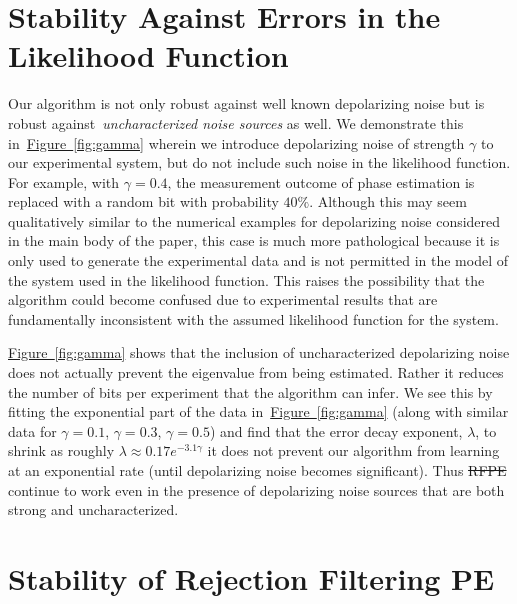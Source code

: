 \documentclass[aps,pra,amsmath,twocolumn,amssymb,superscriptaddress]{revtex4-1}
\newcommand{\fig}[1]{\hyperref[fig:#1]{Figure~\ref*{fig:#1}}}
\providecommand{\DIFaddtex}[1]{{\protect\color{blue}\uwave{#1}}} %
\providecommand{\DIFdeltex}[1]{{\protect\color{red}\sout{#1}}}                      %
\providecommand{\DIFaddbegin}{} %
\providecommand{\DIFaddend}{} %
\providecommand{\DIFdelbegin}{} %
\providecommand{\DIFdelend}{} %
\providecommand{\DIFadd}[1]{\texorpdfstring{\DIFaddtex{#1}}{#1}} %
\providecommand{\DIFdel}[1]{\texorpdfstring{\DIFdeltex{#1}}{}} %
\begin{document}
\section{Stability Against Errors in the Likelihood Function}


Our algorithm is not only robust against well known depolarizing noise but is robust against~\emph{uncharacterized noise sources} as well.  We demonstrate this in~\fig{gamma} wherein we introduce depolarizing noise of strength $\gamma$ to our experimental system, but do not include such noise in the likelihood function.  For example, with $\gamma=0.4$, the measurement outcome of phase estimation is replaced with a random bit with probability $40\%$.  Although this may seem qualitatively similar to the numerical examples for depolarizing noise considered in the main body of the paper, this case is much more pathological because it is only used to generate the experimental data and is not permitted in the model of the system used in the likelihood function.  This raises the possibility that the algorithm could become confused due to experimental results that are fundamentally inconsistent with the assumed likelihood function for the system.

\fig{gamma} shows that the inclusion of uncharacterized depolarizing noise does not actually prevent the eigenvalue from being estimated.  Rather it reduces the number of bits per experiment that the algorithm can infer.  We see this by fitting the exponential part of the data in~\fig{gamma} (along with similar data for $\gamma=0.1$, $\gamma=0.3$, $\gamma=0.5$) and find that the error decay exponent, $\lambda$, to shrink as roughly $\lambda \approx 0.17e^{-3.1\gamma}$ it does not prevent our algorithm from learning at an exponential rate (until depolarizing noise becomes significant).  Thus \DIFdelbegin %
\DIFdel{RFPE }%
\DIFdelend \DIFaddbegin \DIFadd{RFPE }\DIFaddend continue to work even in the presence of depolarizing noise sources that are both strong and uncharacterized.



\section{Stability of Rejection \DIFdelbegin %
\DIFdelend Filtering \DIFdelbegin %
\DIFdelend PE}
\DIFaddbegin \label{app:stability}
\DIFaddend %
\end{document}
